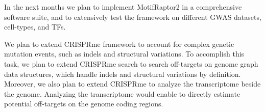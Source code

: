 \documentclass[a4paper, titlepage, openright]{book}
\begin{document}
In the next months we plan to implement MotifRaptor2 in a comprehensive software suite, and to extensively test the framework on different GWAS datasets, cell-types, and TFs.

We plan to extend CRISPRme framework to account for complex genetic mutation events, such as indels and structural variations. To accomplish this task, we plan to extend CRISPRme search to search off-targets on genome graph data structures, which handle indels and structural variations by definition. Moreover, we also plan to extend CRISPRme to analyze the transcriptome beside the genome. Analyzing the transcriptome would enable to directly estimate potential off-targets on the genome coding regions.



\end{document}
